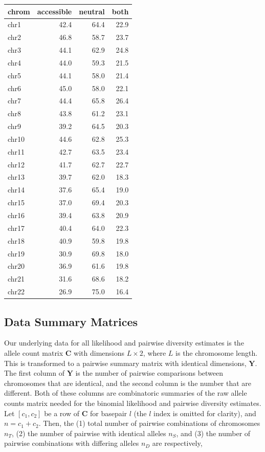 \documentclass[11pt]{article}
\begin{document}
\begin{table}
\centering
\begin{tabular}{lrrr}
  \hline
chrom &  accessible &  neutral &  both \\
  \hline
 chr1 &        42.4 &     64.4 &  22.9 \\
 chr2 &        46.8 &     58.7 &  23.7 \\
 chr3 &        44.1 &     62.9 &  24.8 \\
 chr4 &        44.0 &     59.3 &  21.5 \\
 chr5 &        44.1 &     58.0 &  21.4 \\
 chr6 &        45.0 &     58.0 &  22.1 \\
 chr7 &        44.4 &     65.8 &  26.4 \\
 chr8 &        43.8 &     61.2 &  23.1 \\
 chr9 &        39.2 &     64.5 &  20.3 \\
chr10 &        44.6 &     62.8 &  25.3 \\
chr11 &        42.7 &     63.5 &  23.4 \\
chr12 &        41.7 &     62.7 &  22.7 \\
chr13 &        39.7 &     62.0 &  18.3 \\
chr14 &        37.6 &     65.4 &  19.0 \\
chr15 &        37.0 &     69.4 &  20.3 \\
chr16 &        39.4 &     63.8 &  20.9 \\
chr17 &        40.4 &     64.0 &  22.3 \\
chr18 &        40.9 &     59.8 &  19.8 \\
chr19 &        30.9 &     69.8 &  18.0 \\
chr20 &        36.9 &     61.6 &  19.8 \\
chr21 &        31.6 &     68.6 &  18.2 \\
chr22 &        26.9 &     75.0 &  16.4 \\
\end{tabular}
\end{table}

\subsection{Data Summary Matrices}

Our underlying data for all likelihood and pairwise diversity estimates is the
allele count matrix $\mathbf{C}$ with dimensions $L \times 2$, where $L$ is the
chromosome length. This is transformed to a pairwise summary matrix with
identical dimensions, $\mathbf{Y}$. The first column of $\mathbf{Y}$ is the
number of pairwise comparisons between chromosomes that are identical, and the
second column is the number that are different. Both of these columns are
combinatoric summaries of the raw allele counts matrix needed for the binomial
likelihood and pairwise diversity estimates. Let $[c_1, c_2]$ be a row of
$\mathbf{C}$ for basepair $l$ (the $l$ index is omitted for clarity), and $n =
c_1 + c_2$. Then, the (1) total number of pairwise combinations of chromosomes
$n_T$, (2) the number of pairwise with identical alleles $n_S$, and (3) the
number of pairwise combinations with differing alleles $n_D$ are respectively,
\end{document}
